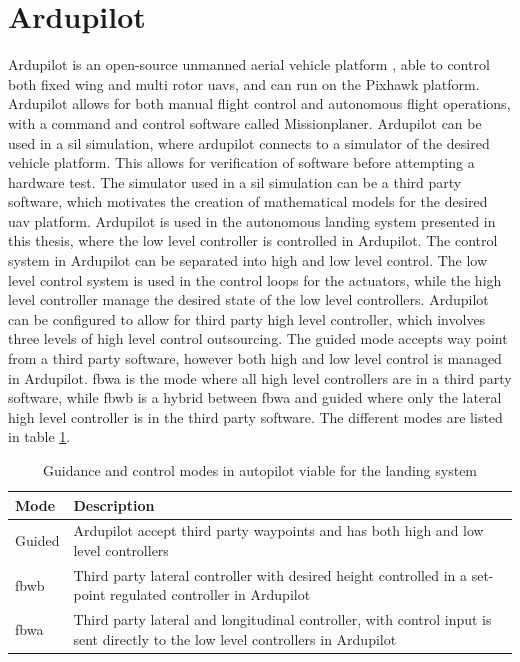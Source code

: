 \section{Ardupilot}\label{ss:ardupilot}
Ardupilot is an open-source unmanned aerial vehicle platform \citep{ArduPilot}, able to control both fixed wing and multi rotor \glspl{uav}, and can run on the Pixhawk platform. Ardupilot allows for both manual flight control and autonomous flight operations, with a command and control software called Missionplaner. Ardupilot can be used in a \gls{sil} simulation, where ardupilot connects to a simulator of the desired vehicle platform. This allows for verification of software before attempting a hardware test. The simulator used in a \gls{sil} simulation can be a third party software, which motivates the creation of mathematical models for the desired \gls{uav} platform. Ardupilot is used in the autonomous landing system presented in this thesis, where the low level controller is controlled in Ardupilot. The control system in Ardupilot can be separated into high and low level control. The low level control system is used in the control loops for the actuators, while the high level controller manage the desired state of the low level controllers. Ardupilot can be configured to allow for third party high level controller, which involves three levels of high level control outsourcing. The guided mode accepts way point from a third party software, however both high and low level control is managed in Ardupilot. \gls{fbwa} is the mode where all high level controllers are in a third party software, while \gls{fbwb} is a hybrid between \gls{fbwa} and guided where only the lateral high level controller is in the third party software. The different modes are listed in table \ref{tb:ArduPilotMode}.
\newpage
\begin{table}[H]
\centering
\begin{tabular}{| p{3cm} | p{5cm}|}
\hline
\textbf{Mode}	&	\textbf{Description} \\ \hline
Guided			& Ardupilot accept third party waypoints and has both high and low level controllers										\\ \hline
\gls{fbwb}			& Third party lateral controller with desired height controlled in a set-point regulated controller in Ardupilot \\ \hline
\gls{fbwa}			& Third party lateral and longitudinal controller, with control input is sent directly to the low level controllers in Ardupilot 	\\ \hline
\end{tabular}
\caption{Guidance and control modes in autopilot viable for the landing system}
\label{tb:ArduPilotMode}
\end{table}

